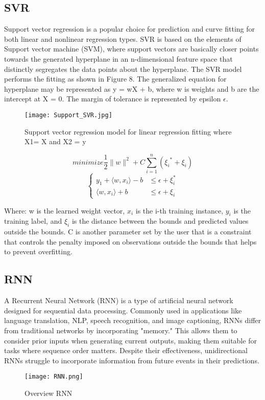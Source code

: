 \documentclass{ieeeojies}
\begin{document}
\subsection{SVR}
Support vector regression is a popular choice for prediction and curve fitting for both linear and nonlinear regression types. SVR is based on the elements of Support vector machine (SVM), where support vectors are basically closer points towards the generated hyperplane in an n-dimensional feature space that distinctly segregates the data points about the hyperplane. The SVR model performs the fitting as shown in Figure 8. The generalized equation for hyperplane may be represented as y = wX + b, where w is weights and b are the intercept at X = 0. The margin of tolerance is represented by epsilon $\epsilon$. \cite{nguyen3} \\
\begin{figure} [H]
    \centering
    \texttt{[image: Support\_SVR.jpg]}
    \caption{Support vector regression model for linear regression fitting where X1= X and X2 = y}
    \label{fig:enter-label}
\end{figure}
\begin{equation}
    minimize {\frac{1}{2}}\|w\|^2+C{\displaystyle \sum_{i=1}^{n}}({\xi_i}^*+\xi_i)
\end{equation}
\begin{equation}
    \begin{cases}
        y_1+\langle w,x_i \rangle-b& \le \epsilon + \xi_i^*\\ 
        \langle w,x_i \rangle + b& \le \epsilon + \xi_i
    \end{cases}
\end{equation}

Where: w is the learned weight vector, $x_i$ is the i-th training instance, $y_i$ is the training label, and $\xi_i$ is the distance between the bounds and predicted values outside the bounds. C is another parameter set by the user that is a constraint that controls the penalty imposed on observations outside the bounds that helps to prevent overﬁtting. \cite{nguyen4}
\subsection{RNN}
A Recurrent Neural Network (RNN) is a type of artificial neural network designed for sequential data processing. Commonly used in applications like language translation, NLP, speech recognition, and image captioning, RNNs differ from traditional networks by incorporating "memory." This allows them to consider prior inputs when generating current outputs, making them suitable for tasks where sequence order matters. Despite their effectiveness, unidirectional RNNs struggle to incorporate information from future events in their predictions\cite{tai3}.
\begin{figure} [H]
    \centering
    \texttt{[image: RNN.png]}
    \caption{Overview RNN}
    \label{fig:enter-label}
\end{figure}
\end{document}
